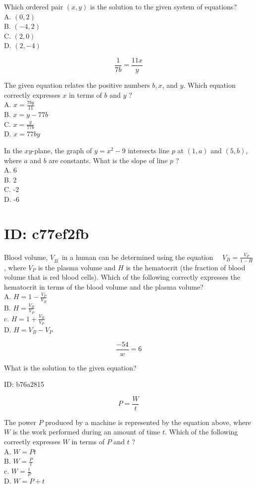 Which ordered pair $(x, y)$ is the solution to the given system of equations?\\
A. $(0,2)$\\
B. $(-4,2)$\\
C. $(2,0)$\\
D. $(2,-4)$

$$
\frac{1}{7 b}=\frac{11 x}{y}
$$

The given equation relates the positive numbers $b, x$, and $y$. Which equation correctly expresses $x$ in terms of $b$ and $y$ ?\\
A. $x=\frac{7 b y}{11}$\\
B. $x=y-77 b$\\
C. $x=\frac{y}{77 b}$\\
D. $x=77 b y$

In the $x y$-plane, the graph of $y=x^{2}-9$ intersects line $p$ at $(1, a)$ and $(5, b)$, where $a$ and $b$ are constants. What is the slope of line $p$ ?\\
A. 6\\
B. 2\\
C. -2\\
D. -6

\section*{ID: c77ef2fb}
Blood volume, $V_{B^{\prime}}$ in a human can be determined using the equation $\quad V_{B}=\frac{V_{P}}{1-H}$ , where $V_{P}$ is the plasma volume and $H$ is the hematocrit (the fraction of blood volume that is red blood cells). Which of the following correctly expresses the hematocrit in terms of the blood volume and the plasma volume?\\
A. $H=1-\frac{V_{P}}{V_{B}}$\\
B. $H=\frac{V_{B}}{V_{P}}$\\
c. $H=1+\frac{V_{B}}{V_{P}}$\\
D. $H=V_{B}-V_{P}$

$$
\frac{-54}{w}=6
$$

What is the solution to the given equation?

ID: b76a2815

$$
P=\frac{W}{t}
$$

The power $P$ produced by a machine is represented by the equation above, where $W$ is the work performed during an amount of time $t$. Which of the following correctly expresses $W$ in terms of $P$ and $t$ ?\\
A. $W=P t$\\
B. $W=\frac{P}{t}$\\
c. $W=\frac{t}{P}$\\
D. $W=P+t$

